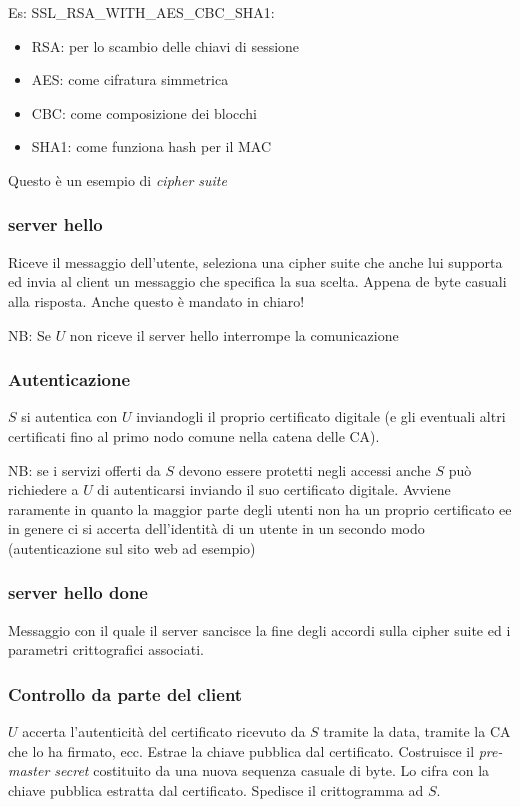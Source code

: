 Es: SSL\_RSA\_WITH\_AES\_CBC\_SHA1:
\begin{itemize}
    \item RSA: per lo scambio delle chiavi di sessione
    \item AES: come cifratura simmetrica
    \item CBC: come composizione dei blocchi
    \item SHA1: come funziona hash per il MAC
\end{itemize}
Questo è un esempio di \emph{cipher suite}

\subsubsection{server hello}
Riceve il messaggio dell'utente, seleziona una cipher suite che anche lui supporta ed invia al client un messaggio che specifica la sua scelta. Appena de byte casuali alla risposta. Anche questo è mandato in chiaro!

NB: Se $U$ non riceve il server hello interrompe la comunicazione

\subsubsection{Autenticazione}
$S$ si autentica con $U$ inviandogli il proprio certificato digitale (e gli eventuali altri certificati fino al primo nodo comune nella catena delle CA).

NB: se i servizi offerti da $S$ devono essere protetti negli accessi anche $S$ può richiedere a $U$ di autenticarsi inviando il suo certificato digitale. Avviene raramente in quanto la maggior parte degli utenti non ha un proprio certificato ee in genere ci si accerta dell'identità di un utente in un secondo modo (autenticazione sul sito web ad esempio)

\subsubsection{server hello done}
Messaggio con il quale il server sancisce la fine degli accordi sulla cipher suite ed i parametri crittografici associati.

\subsubsection{Controllo da parte del client}
$U$ accerta l'autenticità del certificato ricevuto da $S$ tramite la data, tramite la CA che lo ha firmato, ecc. Estrae la chiave pubblica dal certificato. Costruisce il \emph{pre-master secret} costituito da una nuova sequenza casuale di byte. Lo cifra con la chiave pubblica estratta dal certificato. Spedisce il crittogramma ad $S$.

